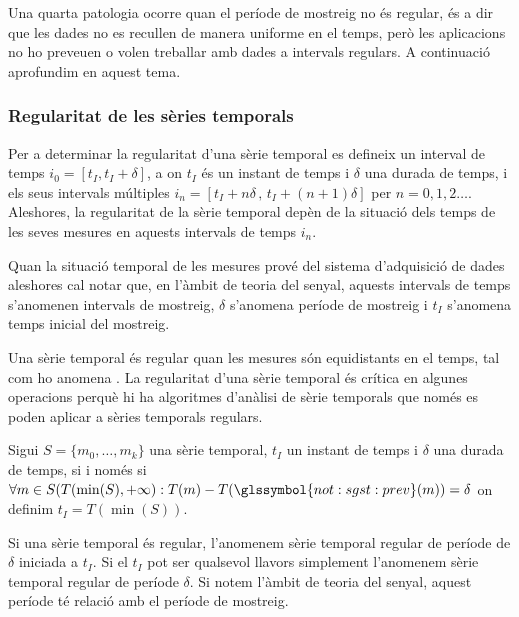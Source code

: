 Una quarta patologia ocorre quan el període de mostreig no és regular,
és a dir que les dades no es recullen de manera uniforme en el temps,
però les aplicacions no ho preveuen o volen treballar amb dades a
intervals regulars. A continuació aprofundim en aquest tema.






\subsubsection{Regularitat de les sèries temporals} 
\label{sec:sgst:regularitat}


Per a determinar la regularitat d'una sèrie temporal es defineix un
interval de temps $i_0=[t_I,t_I+\delta]$, a on $t_I$ és un instant de
temps i $\delta$ una durada de temps, i els seus intervals múltiples
$i_n=[t_I+n\delta\, ,\, t_I+(n+1)\delta]$ per
$n=0,1,2\ldots$. Aleshores, la regularitat de la sèrie temporal depèn
de la situació dels temps de les seves mesures en aquests intervals de
temps $i_n$.
 
Quan la situació temporal de les mesures prové del sistema
d'adquisició de dades aleshores cal notar que, en l'àmbit de
teoria del senyal, aquests intervals de temps s'anomenen intervals de
mostreig, $\delta$ s'anomena període de mostreig i $t_I$ s'anomena
temps inicial del mostreig.


Una sèrie temporal és regular quan les mesures són equidistants en el
temps, tal com ho anomena \textcite{last:hetland}.  La regularitat
d'una sèrie temporal és crítica en algunes operacions perquè hi ha
algoritmes d'anàlisi de sèrie temporals que només es poden aplicar a
sèries temporals regulars.
\begin{definition}
  \label{def:st:regular}
  Sigui $S=\{m_0,\ldots,m_k\}$ una sèrie temporal, $t_I$ un instant de
  temps i $\delta$ una durada de temps,
   si i només si $\forall
  m \in S(T(\min(S),+\infty):T(m) - T(\glssymbol{not:sgst:prev}(m)) =
  \delta$ on definim $t_I=T(\min(S))$.
\end{definition}

Si una sèrie temporal és regular, l'anomenem sèrie temporal regular de
període de $\delta$ iniciada a $t_I$. Si el $t_I$ pot ser qualsevol
llavors simplement l'anomenem sèrie temporal regular de període
$\delta$.  Si notem l'àmbit de teoria del senyal, aquest període té
relació amb el període de mostreig.


